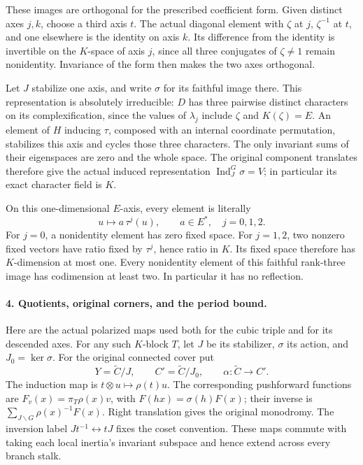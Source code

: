 These images are orthogonal for the prescribed coefficient
form. Given distinct axes \(j,k\), choose a third axis \(t\).
The actual diagonal element with \(\zeta\) at \(j\),
\(\zeta^{-1}\) at \(t\), and one elsewhere is the identity
on axis \(k\). Its difference from the identity is
invertible on the \(K\)-space of axis \(j\), since all
three conjugates of \(\zeta\ne1\) remain nonidentity.
Invariance of the form then makes the two axes orthogonal.

Let \(J\) stabilize one axis, and write \(\sigma\) for
its faithful image there. This representation is absolutely
irreducible: \(D\) has three pairwise distinct characters
on its complexification, since the values of \(\lambda_j\)
include \(\zeta\) and \(K(\zeta)=E\). An element of \(H\)
inducing \(\tau\), composed with an internal coordinate
permutation, stabilizes this axis and cycles those three
characters. The only invariant sums of their eigenspaces
are zero and the whole space. The original component
translates therefore give the actual induced representation
\(\operatorname{Ind}_J^G\sigma=V\); in particular its
exact character field is \(K\).

On this one-dimensional \(E\)-axis, every element is literally
\[
                         u\longmapsto a\,\tau^j(u),
                         \qquad a\in E^*,\quad j=0,1,2.
 \tag{S44.12}
\]
For \(j=0\), a nonidentity element has zero fixed space.
For \(j=1,2\), two nonzero fixed vectors have ratio fixed
by \(\tau^j\), hence ratio in \(K\). Its fixed space
therefore has \(K\)-dimension at most one. Every nonidentity
element of this faithful rank-three image has codimension
at least two. In particular it has no reflection.

\paragraph{4. Quotients, original corners, and the period bound.}
Here are the actual polarized maps used both for the cubic
triple and for its descended axes. For any such \(K\)-block
\(T\), let \(J\) be its stabilizer, \(\sigma\) its action,
and \(J_0=\ker\sigma\). For the original connected cover put
\[
 Y=\widetilde C/J,\qquad C'=\widetilde C/J_0,\qquad
 \alpha:\widetilde C\longrightarrow C'.
 \tag{S44.13}
\]
The induction map is \(t\otimes u\mapsto\rho(t)u\).
The corresponding pushforward functions are
\(F_v(x)=\pi_T\rho(x)v\), with \(F(hx)=\sigma(h)F(x)\);
their inverse is \(\sum_{J\backslash G}\rho(x)^{-1}F(x)\).
Right translation gives the original monodromy. The inversion
label \(Jt^{-1}\leftrightarrow tJ\) fixes the coset convention.
These maps commute with taking each local inertia's invariant
subspace and hence extend across every branch stalk.

